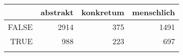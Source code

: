 \begin{tabular}{rrrr}
  \lsptoprule
 & abstrakt & konkretum & menschlich \\ 
  \midrule
FALSE & 2914 & 375 & 1491 \\ 
  TRUE & 988 & 223 & 697 \\ 
   \lspbottomrule
\end{tabular}
